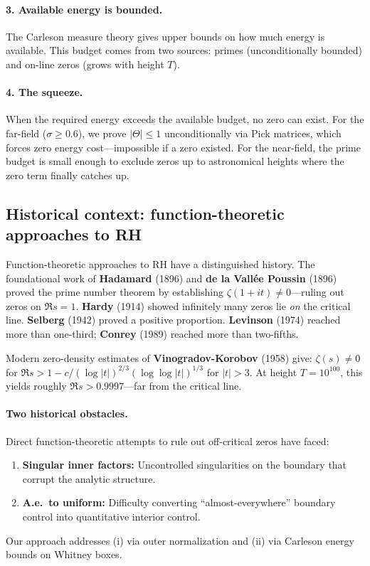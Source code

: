 \documentclass[11pt]{article}
\theoremstyle{definition}
\theoremstyle{remark}
\theoremstyle{definition}
\begin{document}
\paragraph{3. Available energy is bounded.} The Carleson measure theory gives upper bounds on how much energy is available. This budget comes from two sources: primes (unconditionally bounded) and on-line zeros (grows with height $T$).

\paragraph{4. The squeeze.} When the required energy exceeds the available budget, no zero can exist. For the far-field ($\sigma \ge 0.6$), we prove $|\Theta| \le 1$ unconditionally via Pick matrices, which forces zero energy cost---impossible if a zero existed. For the near-field, the prime budget is small enough to exclude zeros up to astronomical heights where the zero term finally catches up.

\subsection*{Historical context: function-theoretic approaches to RH}

Function-theoretic approaches to RH have a distinguished history. The foundational work of \textbf{Hadamard} (1896) and \textbf{de la Vall\'ee Poussin} (1896) proved the prime number theorem by establishing $\zeta(1+it) \neq 0$---ruling out zeros on $\Re s = 1$. \textbf{Hardy} (1914) showed infinitely many zeros lie \emph{on} the critical line. \textbf{Selberg} (1942) proved a positive proportion. \textbf{Levinson} (1974) reached more than one-third; \textbf{Conrey} (1989) reached more than two-fifths.

Modern zero-density estimates of \textbf{Vinogradov-Korobov} (1958) give: $\zeta(s) \neq 0$ for $\Re s > 1 - c/(\log |t|)^{2/3}(\log\log|t|)^{1/3}$ for $|t| > 3$. At height $T = 10^{100}$, this yields roughly $\Re s > 0.9997$---far from the critical line.

\paragraph{Two historical obstacles.} Direct function-theoretic attempts to rule out off-critical zeros have faced:
\begin{enumerate}
\item[(i)] \textbf{Singular inner factors:} Uncontrolled singularities on the boundary that corrupt the analytic structure.
\item[(ii)] \textbf{A.e.\ to uniform:} Difficulty converting ``almost-everywhere'' boundary control into quantitative interior control.
\end{enumerate}
Our approach addresses (i) via outer normalization and (ii) via Carleson energy bounds on Whitney boxes.
\end{document}
